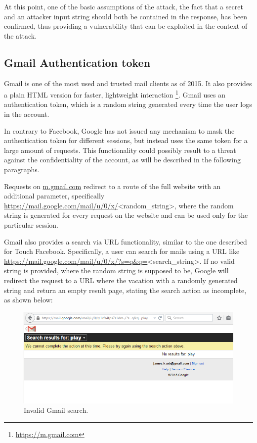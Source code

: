At this point, one of the basic assumptions of the attack, the fact that a
secret and an attacker input string should both be contained in the response,
has been confirmed, thus providing a vulnerability that can be exploited in the
context of the attack.

\subsection{Gmail Authentication token}

Gmail is one of the most used and trusted mail clients as of 2015. It also
provides a plain HTML version for faster, lightweight interaction
\footnote{\url{https://m.gmail.com}}. Gmail uses an authentication token, which
is a random string generated every time the user logs in the account.

In contrary to Facebook, Google has not issued any mechanism to mask the
authentication token for different sessions, but instead uses the same token for
a large amount of requests. This functionality could possibly result to a threat
against the confidentiality of the account, as will be described in the
following paragraphs.

Requests on \url{m.gmail.com} redirect to a route of the full website with an
additional parameter, specifically
\url{https://mail.google.com/mail/u/0/x/}<random\_string>, where the random
string is generated for every request on the website and can be used only for
the particular session.

Gmail also provides a search via URL functionality, similar to the one described
for Touch Facebook. Specifically, a user can search for mails using a URL like
\url{https://mail.google.com/mail/u/0/x/?s=q&q=}<search\_string>. If no valid
string is provided, where the random string is supposed to be, Google will
redirect the request to a URL where the vacation with a randomly generated
string and return an empty result page, stating the search action as incomplete,
as shown below:

\begin{figure}[H] \caption{Invalid Gmail search.} \centering
\includegraphics[width=1\textwidth]{diagrams/gmail_search.png}\end{figure}

